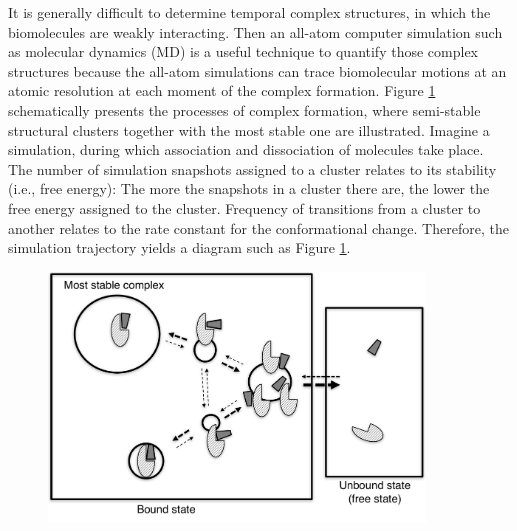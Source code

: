 It is generally difficult to determine temporal complex structures, in which the biomolecules are weakly interacting. Then an all-atom computer simulation such as molecular dynamics (MD) is a useful technique to quantify those complex structures because the all-atom simulations can trace biomolecular motions at an atomic resolution at each moment of the complex formation. Figure \ref{fig:u_b_states_pic} schematically presents the processes of complex formation, where semi-stable structural clusters together with the most stable one are illustrated. Imagine a simulation, during which association and dissociation of molecules take place. The number of simulation snapshots assigned to a cluster relates to its stability (i.e., free energy): The more the snapshots in a cluster there are, the lower the free energy assigned to the cluster. Frequency of transitions from a cluster to another relates to the rate constant for the conformational change. Therefore, the simulation trajectory yields a diagram such as Figure \ref{fig:u_b_states_pic}.
\begin{figure}
  \centering
  \includegraphics[width=10cm]{../enhance_rev/figures/u_b_states_pic.pdf}
  \caption{\label{fig:u_b_states_pic}}
\end{figure}

